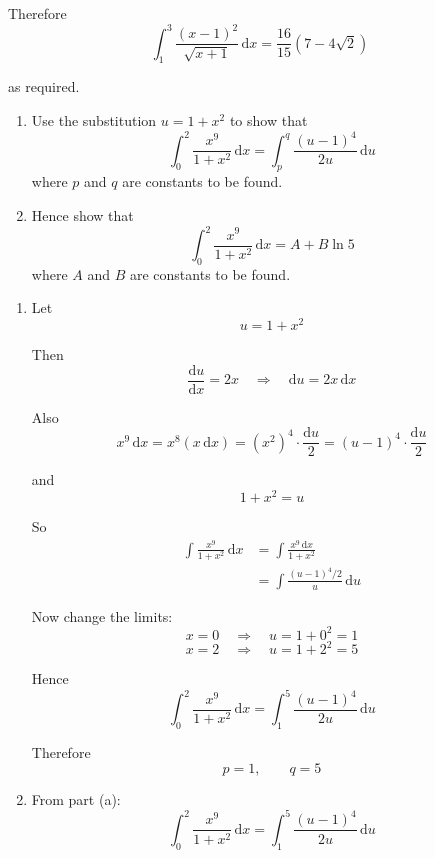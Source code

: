 \documentclass[leqno]{article}
\begin{document}
\begin{enumerate}[
  label=\textbf{\arabic*.},
  leftmargin=*,
  topsep=0pt,
  partopsep=0pt,
  parsep=0pt
]
\begin{djsSolution}
Therefore
\[
\int_1^3 \frac{(x-1)^2}{\sqrt{x+1}}\,\mathrm{d}x=\frac{16}{15}(7-4\sqrt{2})
\]

as required.
\end{djsSolution}


\newpage

\questionitem

\begin{enumerate}[label=\textbf{(\alph*)}]
  \item Use the substitution $u = 1 + x^2$ to show that
  \[
  \int_0^2 \frac{x^9}{1+x^2}\,\mathrm{d}x = \int_p^q \frac{(u-1)^4}{2u}\,\mathrm{d}u
  \]
  where $p$ and $q$ are constants to be found.  \\
  \item Hence show that
  \[
  \int_0^2 \frac{x^9}{1+x^2}\,\mathrm{d}x = A + B\ln 5
  \]
  where $A$ and $B$ are constants to be found.  \\
\end{enumerate}

\vspace*{10pt}

\begin{djsSolution}
\begin{enumerate}[label=\textbf{(\alph*)}]
  \item Let
\[
u=1+x^2
\]

Then
\[
\frac{\mathrm{d}u}{\mathrm{d}x}=2x\quad\Longrightarrow\quad\mathrm{d}u=2x\,\mathrm{d}x
\]

Also
\[
x^9\,\mathrm{d}x=x^8(x\,\mathrm{d}x)=(x^2)^4\cdot \frac{\mathrm{d}u}{2}=(u-1)^4\cdot \frac{\mathrm{d}u}{2}
\]

and
\[
1+x^2=u
\]

So
\begin{align*}
\int \frac{x^9}{1+x^2}\,\mathrm{d}x
&=\int \frac{x^9\,\mathrm{d}x}{1+x^2} \\
&=\int \frac{(u-1)^4/2}{u}\,\mathrm{d}u
\end{align*}

Now change the limits:
\[
x=0\quad\Longrightarrow\quad u=1+0^2=1
\]
\[
x=2\quad\Longrightarrow\quad u=1+2^2=5
\]

Hence
\[
\int_0^2 \frac{x^9}{1+x^2}\,\mathrm{d}x=\int_1^5 \frac{(u-1)^4}{2u}\,\mathrm{d}u
\]

Therefore
\[
p=1,\qquad q=5
\]

  \item From part (a):
\[
\int_0^2 \frac{x^9}{1+x^2}\,\mathrm{d}x=\int_1^5 \frac{(u-1)^4}{2u}\,\mathrm{d}u
\]


\end{enumerate}
\end{djsSolution}
\end{enumerate}
\end{document}
